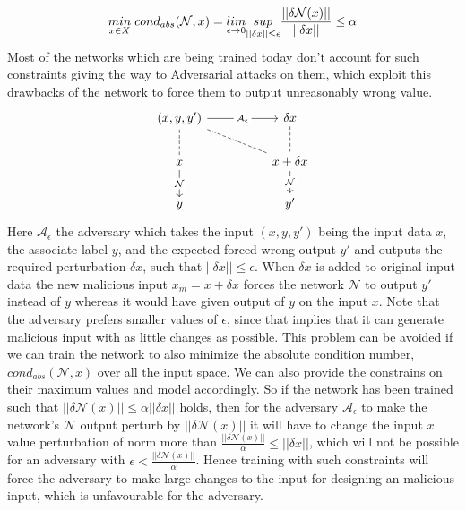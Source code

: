 \begin{equation}
    \underset{x\in X}{min}\hspace{1mm} cond_{abs}(\mathcal{N},x) = \underset{\epsilon \to 0}{lim}\underset{||\delta x||\le \epsilon}{sup} \frac{||\delta \mathcal{N}(x)||}{||\delta x||} \le \alpha
\end{equation}\newline 
Most of the networks which are being trained today don't account for such constraints giving the way to Adversarial attacks on them, which exploit this drawbacks of the network to force them to output unreasonably wrong value.
\begin{equation}
\begin{tikzcd}
{(x,y,y')} \arrow[rr, "\mathcal{A}_{\epsilon}" description] \arrow[rrd, no head, dashed] \arrow[d, no head, dashed] &  & \delta x \arrow[d, no head, dashed]\\
x \arrow[d, "\mathcal{N}" description] &  & x+\delta x \arrow[d, "\mathcal{N}" description] \\
y& & y'
\end{tikzcd}
\end{equation}\newline
Here $\mathcal{A}_{\epsilon}$ the adversary which takes the input $(x,y,y')$ being the input data $x$, the associate label $y$, and the expected forced wrong output $y'$ and outputs the required perturbation $\delta x$, such that $||\delta x|| \le \epsilon$. When $\delta x$ is added to original input data the new malicious input $x_m = x + \delta x$ forces the network $\mathcal{N}$ to output $y'$ instead of $y$ whereas it would have given output of $y$ on the input $x$. Note that the adversary prefers smaller values of $\epsilon$, since that implies that it can generate malicious input with as little changes as possible.\newline
This problem can be avoided if we can train the network to also minimize the absolute condition number, $cond_{abs}(\mathcal{N},x)$ over all the input space. We can also provide the constrains on their maximum values and model accordingly.\newline
So if the network has been trained such that $||\delta \mathcal{N}(x)||\le \alpha ||\delta x||$ holds, then for the adversary $\mathcal{A}_{\epsilon}$ to make the network's $\mathcal{N}$ output perturb by $||\delta \mathcal{N}(x)||$ it will have to change the input $x$ value perturbation of norm more than $\frac{||\delta \mathcal{N}(x)||}{\alpha} \le ||\delta x||$, which will not be possible for an adversary with $\epsilon < \frac{||\delta \mathcal{N}(x)||}{\alpha}$. Hence training with such constraints will force the adversary to make large changes to the input for designing an malicious input, which is unfavourable for the adversary.
